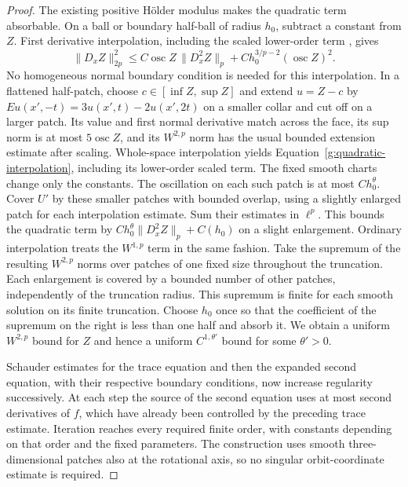 \begin{proof}
The existing positive H\"older modulus makes the quadratic term
absorbable.  On a ball or boundary half-ball of radius $h_0$, subtract
a constant from $Z$.  First derivative interpolation, including the
scaled lower-order term \cite{Nirenberg1959}, gives
\begin{equation}\label{g:quadratic-interpolation}
 \|D_xZ\|_{2p}^2
 \leq C\operatorname{osc}Z\,\|D_x^2Z\|_p
       +Ch_0^{3/p-2}(\operatorname{osc}Z)^2.
\end{equation}
No homogeneous normal boundary condition is needed for this
interpolation.  In a flattened half-patch, choose
$c\in[\inf Z,\sup Z]$ and extend $u=Z-c$ by
$Eu(x',-t)=3u(x',t)-2u(x',2t)$ on a smaller collar and cut off on a
larger patch.  Its value and first normal derivative match across the
face, its sup norm is at most $5\operatorname{osc}Z$, and its
$W^{2,p}$ norm has the usual bounded extension estimate after scaling.
Whole-space interpolation yields
Equation~\eqref{g:quadratic-interpolation}, including its lower-order
scaled term.  The fixed smooth charts change only the constants.
The oscillation on each such patch is at most $Ch_0^\theta$.
Cover $U'$ by these smaller patches with bounded overlap, using a
slightly enlarged patch for each interpolation estimate.  Sum their
estimates in $\ell^p$.  This bounds the quadratic term by
$Ch_0^\theta\|D_x^2Z\|_p+C(h_0)$ on a slight enlargement.
Ordinary interpolation treats the $W^{1,p}$ term in the same fashion.
Take the supremum of the resulting $W^{2,p}$ norms over patches of one
fixed size throughout the truncation.  Each enlargement is covered by
a bounded number of other patches, independently of the truncation
radius.  This supremum is finite for each smooth solution on its finite
truncation.  Choose $h_0$ once so that the coefficient of the supremum
on the right is less than one half and absorb it.  We obtain a uniform
$W^{2,p}$ bound for $Z$ and hence a uniform $C^{1,\theta'}$ bound for
some $\theta'>0$.

Schauder estimates for the trace equation and then the expanded second
equation, with their respective boundary conditions, now increase
regularity successively.  At each step the source of the second
equation uses at most second derivatives of $f$, which have already
been controlled by the preceding trace estimate.  Iteration reaches
every required finite order, with constants depending on that order
and the fixed parameters.  The construction uses smooth
three-dimensional patches also at the rotational axis, so no singular
orbit-coordinate estimate is required.
\end{proof}
